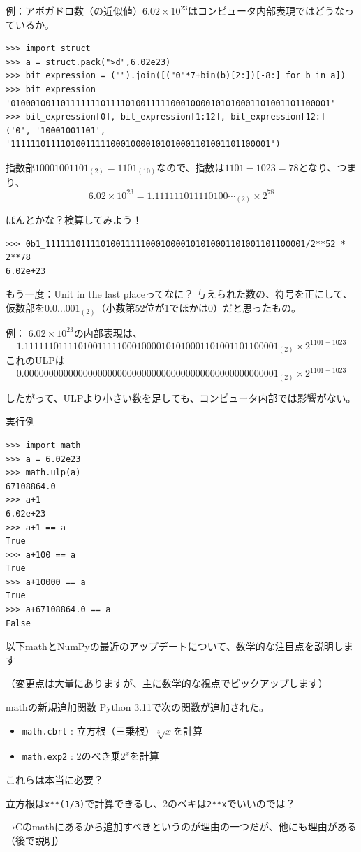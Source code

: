 \documentclass[unicode,lualatex,aspectratio=169]{beamer}
\begin{document}
\begin{frame}[fragile]
  例：アボガドロ数（の近似値）$6.02\times 10^{23}$はコンピュータ内部表現ではどうなっているか。
{\fontsize{6pt}{6pt}\selectfont
\begin{verbatim}
>>> import struct
>>> a = struct.pack(">d",6.02e23) 
>>> bit_expression = ("").join([("0"*7+bin(b)[2:])[-8:] for b in a])
>>> bit_expression
'0100010011011111110111101001111100010000101010001101001101100001'
>>> bit_expression[0], bit_expression[1:12], bit_expression[12:]
('0', '10001001101', '1111110111101001111100010000101010001101001101100001')
\end{verbatim}
}
指数部$10001001101_{(2)}=1101_{(10)}$なので、指数は$1101-1023=78$となり、つまり、
\[
  6.02\times 10^{23} = 1.111111011110100\cdots_{(2)} \times 2^{78}
\]

ほんとかな？検算してみよう！
{\fontsize{6pt}{6pt}\selectfont    
\begin{verbatim}
>>> 0b1_1111110111101001111100010000101010001101001101100001/2**52 * 2**78
6.02e+23
\end{verbatim}
}
\end{frame}
\begin{frame}[fragile]{もう一度：Unit in the last placeってなに？}
  与えられた数の、符号を正にして、仮数部を$0.0\dots 001_{(2)}$（小数第52位が1でほかは0）だと思ったもの。

  
  例：
  $6.02\times 10^{23}$の内部表現は、
  {\tiny \[\mathtt{1.1111110111101001111100010000101010001101001101100001}_{(2)} \times 2^{1101-1023}\]}
  これのULPは
  {\tiny \[\mathtt{0.0000000000000000000000000000000000000000000000000001}_{(2)} \times 2^{1101-1023}\]}

  したがって、ULPより小さい数を足しても、コンピュータ内部では影響がない。
\end{frame}
\begin{frame}[fragile]
実行例
{\fontsize{8pt}{8pt}\selectfont
\begin{verbatim}
>>> import math
>>> a = 6.02e23
>>> math.ulp(a)
67108864.0
>>> a+1
6.02e+23
>>> a+1 == a
True
>>> a+100 == a
True
>>> a+10000 == a
True
>>> a+67108864.0 == a
False
\end{verbatim}
}
\end{frame}
\begin{frame}[fragile]
  以下mathとNumPyの最近のアップデートについて、数学的な注目点を説明します
  
  （変更点は大量にありますが、主に数学的な視点でピックアップします）
\end{frame}
\begin{frame}[fragile]{mathの新規追加関数}
  Python 3.11で次の関数が追加された。
  \begin{itemize}
  \item \verb|math.cbrt| : 立方根（三乗根）$\sqrt[3]{x}$を計算
  \item \verb|math.exp2| : 2のべき乗$2^x$を計算
  \end{itemize}
  これらは本当に必要？

  立方根は\verb|x**(1/3)|で計算できるし、2のベキは\verb|2**x|でいいのでは？

  →Cのmathにあるから追加すべきというのが理由の一つだが、他にも理由がある（後で説明）
\end{frame}
\end{document}
